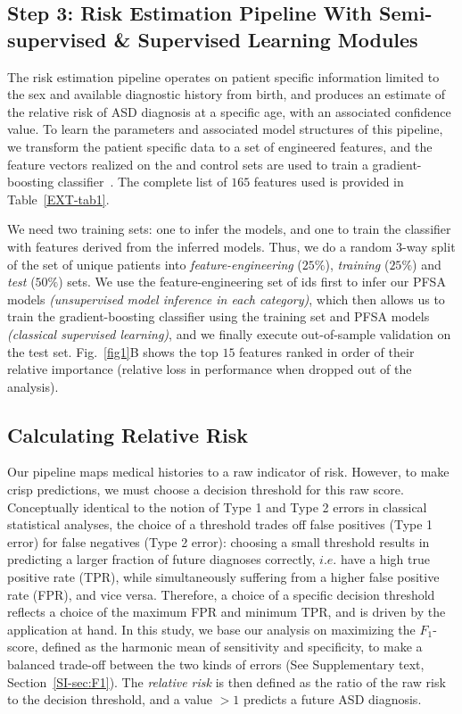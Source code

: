 \documentclass[3p,super,numbers,sort&compress,preprint,10pt]{elsarticle}
\begin{document}
\subsection*{Step 3: Risk Estimation Pipeline With Semi-supervised \& Supervised Learning Modules}
The risk estimation pipeline operates on patient specific information limited to the sex and available  diagnostic history from birth, and produces an estimate of the relative risk of ASD diagnosis at a specific age, with an associated  confidence value. To learn the parameters and associated model structures of  this pipeline, we transform the patient specific data to a set of engineered features, and the feature vectors realized on the
\treatment and control sets are  used to train a gradient-boosting classifier~\cite{gbm02}. The complete list of $165$ features used  is provided in Table~\ref{EXT-tab1}.

We need two training sets: one to infer the models, and one to  train the classifier  with features  derived  from the inferred models. Thus, we do a random 3-way split of the set of unique patients into \textit{feature-engineering} ($25\%$), \textit{training} ($25\%$) and \textit{test} ($50\%$) sets. We use the feature-engineering set of ids first to infer our PFSA models \textit{(unsupervised model inference in each category)}, which then allows us to train the gradient-boosting classifier using the training set and PFSA models \textit{(classical supervised learning)}, and we finally execute  out-of-sample validation on the test set. Fig.~\ref{fig1}B shows the top $15$ features  ranked in order of their relative importance (relative loss in performance when dropped out of the analysis). 
\subsection*{Calculating Relative Risk}
Our pipeline maps medical histories to a   raw indicator of 
risk. However, to make crisp predictions, we must choose  a decision threshold for this raw score. Conceptually identical to the notion of Type 1 and Type 2 errors in classical statistical analyses, the choice of a threshold trades off false positives (Type 1 error) for false negatives (Type 2 error): choosing a small threshold  results in predicting a larger fraction of future diagnoses correctly, $i.e.$ have a high true positive rate (TPR), while simultaneously suffering from a higher false positive rate (FPR), and vice versa. Therefore, a choice of a specific decision threshold   reflects a choice of the maximum FPR and minimum TPR, and is   driven by the application at hand. In this study, we base our analysis on maximizing the $F_1$-score, defined as the harmonic mean of sensitivity and specificity, to make a   balanced trade-off between the two kinds of errors (See Supplementary text, Section~\ref{SI-sec:F1}). The \textit{relative risk} is then defined as the ratio of the raw  risk to the  decision threshold, and a value  $>1$  predicts a future ASD diagnosis.
\end{document}
